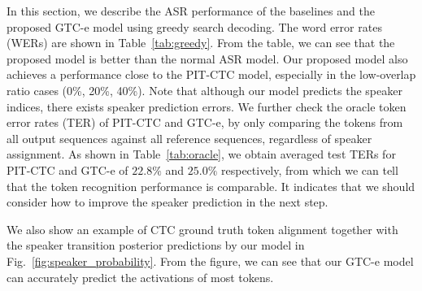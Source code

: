 \documentclass{article}
\begin{document}
\begin{table}[t]
    \centering
    \caption{Oracle TER(\%) comparison between PIT-CTC and GTC-e.}
    \label{tab:oracle}
    \vspace{-12pt}
\end{table}

In this section, we describe the ASR performance of the baselines and the proposed GTC-e model using greedy search decoding. The word error rates (WERs) are shown in Table~\ref{tab:greedy}. From the table, we can see that the proposed model is better than the normal ASR model. Our proposed model also achieves a performance close to the PIT-CTC model, especially in the low-overlap ratio cases (0\%, 20\%, 40\%). Note that although our model predicts the speaker indices, there exists speaker prediction errors. We further check the oracle token error rates (TER) of PIT-CTC and GTC-e, by only comparing the tokens from all output sequences against all reference sequences, regardless of speaker assignment. As shown in Table~\ref{tab:oracle}, we obtain averaged test TERs for PIT-CTC and GTC-e of $22.8\%$ and $25.0\%$ respectively, from which we can tell that the token recognition performance is comparable. It indicates that we should consider how to improve the speaker prediction in the next step.

We also show an example of CTC ground truth token alignment together with the speaker transition posterior predictions by our model in Fig.~\ref{fig:speaker_probability}. From the figure, we can see that our GTC-e model can accurately predict the activations of most tokens.
\end{document}
